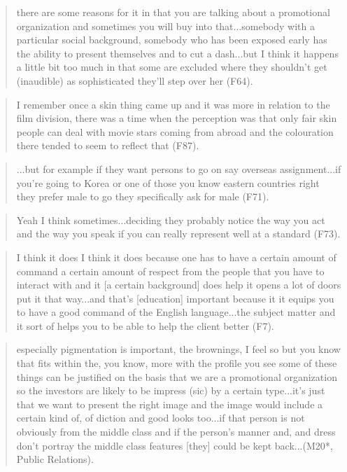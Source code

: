 \begin{quote}
	there are some reasons for it in that you are talking about a promotional organization and sometimes you will buy into that...somebody with a particular social background, somebody who has been exposed early has the ability to present themselves and to cut a dash...but I think it happens a little bit too much in that some are excluded where they shouldn’t get (inaudible) as sophisticated they’ll step over her (F64).
\end{quote}

\begin{quote}
	I remember once a skin thing came up and it was more in relation to the film division, there was a time when the perception was that only fair skin people can deal with movie stars coming from abroad and the colouration there tended to seem to reflect that (F87).
\end{quote}

\begin{quote}
	...but for example if they want persons to go on say overseas assignment...if you’re going to Korea or one of those you know eastern countries right they prefer male to go they specifically ask for male (F71).
\end{quote}

\begin{quote}
	Yeah I think sometimes...deciding they probably notice the way you act and the way you speak if you can really represent well at a standard (F73).
\end{quote}

\begin{quote}
	I think it does I think it does because one has to have a certain amount of command a certain amount of respect from the people that you have to interact with and it [a certain background] does help it opens a lot of doors put it that way...and that’s [education] important because it it equips you to have a good command of the English language...the subject matter and it sort of helps you to be able to help the client better (F7).
\end{quote}

\begin{quote}
	 especially pigmentation is important, the brownings, I feel so but you know that fits within the, you know, more with the profile you see some of these things can be justified on the basis that we are a promotional organization so the investors are likely to be impress (sic) by a certain type...it's just that we want to present the right image and the image would include a certain kind of, of diction and good looks too...if that person is not obviously from the middle class and if the person’s manner and, and dress don’t portray the middle class features [they] could be kept back...(M20*, Public Relations).
\end{quote}

